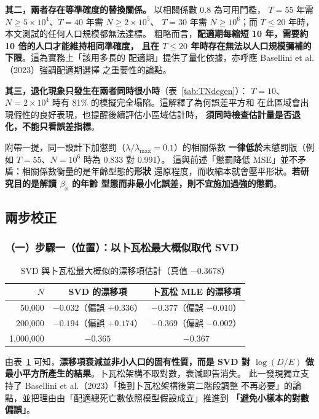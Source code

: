 \documentclass[UTF8, fontset=macnew, a4paper, 12pt]{ctexart}
\begin{document}
\textbf{其二，兩者存在等準確度的替換關係。} 以相關係數 0.8 為可用門檻，
$T=55$ 年需 $N\ge5\times10^4$、$T=40$ 年需 $N\ge2\times10^5$、
$T=30$ 年需 $N\ge10^6$；而 $T\le20$ 年時，本文測試的任何人口規模都無法達標。
粗略而言，\textbf{配適期每縮短 10 年，需要約 10 倍的人口才能維持相同準確度，
且在 $T\le20$ 年時存在無法以人口規模彌補的下限}。這為實務上「該用多長的
配適期」提供了量化依據，亦呼應 Basellini et al.（2023）強調配適期選擇
之重要性的論點。

\textbf{其三，退化現象只發生在兩者同時很小時}（表~\ref{tab:TNdegen}）：
$T=10$、$N=2\times10^4$ 時有 81\% 的模擬完全塌陷。這解釋了為何誤差平方和
在此區域會出現假性的良好表現，也提醒後續評估小區域估計時，
\textbf{須同時檢查估計量是否退化，不能只看誤差指標}。

附帶一提，同一設計下加懲罰（$\lambda/\lambda_{\max}=0.1$）的相關係數
\textbf{一律低於}未懲罰版（例如 $T=55$、$N=10^6$ 時為 0.833 對 0.991）。
這與前述「懲罰降低 MSE」並不矛盾：相關係數衡量的是年齡型態的\textbf{形狀}
還原程度，而收縮本就會壓平形狀。\textbf{若研究目的是解讀 $\beta_x$ 的年齡
型態而非最小化誤差，則不宜施加過強的懲罰}。

\subsection{兩步校正}

\subsubsection{（一）步驟一（位置）：以卜瓦松最大概似取代 SVD}

\begin{table}[H]
\centering
\caption{SVD 與卜瓦松最大概似的漂移項估計（真值 $-0.3678$）}
\small
\begin{tabular}{rcc}
\toprule
$N$ & SVD 的漂移項 & 卜瓦松 MLE 的漂移項\\
\midrule
50,000    & $-0.032$（偏誤 $+0.336$） & $\mathbf{-0.377}$（偏誤 $-0.010$）\\
200,000   & $-0.194$（偏誤 $+0.174$） & $\mathbf{-0.369}$（偏誤 $-0.002$）\\
1,000,000 & $-0.365$ & $-0.367$\\
\bottomrule
\end{tabular}
\label{tab:drift}
\end{table}

由表~\ref{tab:drift} 可知，\textbf{漂移項衰減並非小人口的固有性質，而是 SVD 對
$\log(D/E)$ 做最小平方所產生的結果}。卜瓦松架構不取對數，衰減即告消失。
此一發現獨立支持了 Basellini et al.（2023）「換到卜瓦松架構後第二階段調整
不再必要」的論點，並把理由由「配適總死亡數依照模型假設成立」推進到
\textbf{「避免小樣本的對數偏誤」}。
\end{document}
